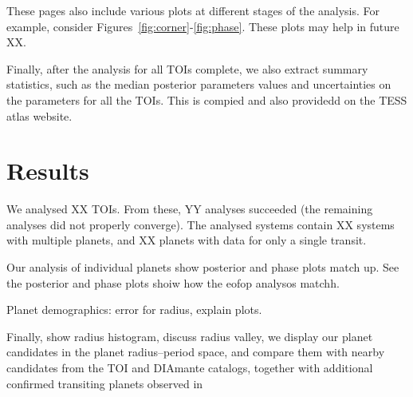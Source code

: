 \documentclass[floatfix,ApJL,twocolumn]{aastex631}
\begin{document}
These pages also include various plots at different stages of the analysis. 
For example, consider Figures~\ref{fig:corner}-\ref{fig:phase}.
These plots may help in future XX.


Finally, after the analysis for all TOIs complete, we also extract summary statistics, such as the median posterior parameters values and uncertainties on the parameters for all the TOIs. 
This is compied and also providedd on the TESS atlas website.






\section{Results}\label{sec:results}


We analysed XX TOIs. 
From these, YY analyses succeeded (the remaining analyses did not properly converge). 
The analysed systems contain XX systems with multiple planets, and XX planets with data for only a single transit. 




Our analysis of individual planets show posterior and phase plots match up. 
See the posterior and phase plots shoiw how the eofop analysos matchh.

Planet demographics: 
error for radius, explain plots.

Finally, show radius histogram, discuss radius valley, we display our
planet candidates in the planet radius–period space, and compare them with nearby candidates from the TOI and DIAmante catalogs, together with additional confirmed transiting planets observed in
\end{document}
